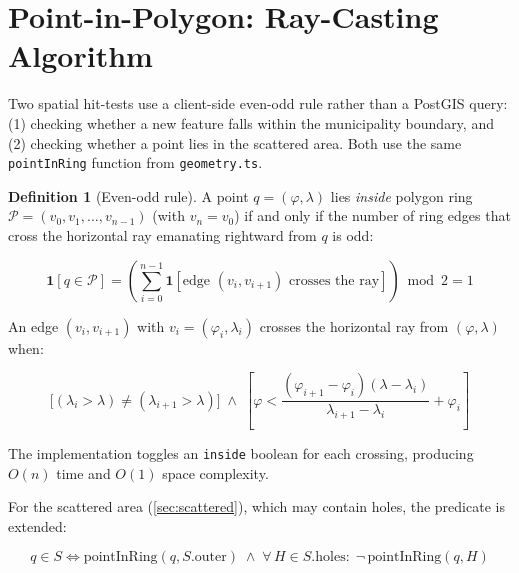 \documentclass[12pt,a4paper]{article}
\theoremstyle{definition}
\newtheorem{definition}{Definition}[section]
\theoremstyle{plain}
\theoremstyle{remark}
\begin{document}
\section{Point-in-Polygon: Ray-Casting Algorithm}
\label{sec:pip}

Two spatial hit-tests use a client-side even-odd rule rather than a
PostGIS query: (1) checking whether a new feature falls within the
municipality boundary, and (2) checking whether a point lies in the
scattered area. Both use the same \texttt{pointInRing} function from
\texttt{geometry.ts}.

\begin{definition}[Even-odd rule]
A point $q = (\varphi, \lambda)$ lies \emph{inside} polygon ring
$\mathcal{P} = (v_0, v_1, \ldots, v_{n-1})$ (with $v_n = v_0$) if and
only if the number of ring edges that cross the horizontal ray emanating
rightward from $q$ is odd:

\begin{equation}
  \mathbf{1}[q \in \mathcal{P}] =
  \left(\sum_{i=0}^{n-1} \mathbf{1}[\text{edge } (v_i, v_{i+1})
  \text{ crosses the ray}]\right) \bmod 2 = 1
  \label{eq:pip_even_odd}
\end{equation}
\end{definition}

An edge $(v_i, v_{i+1})$ with $v_i = (\varphi_i, \lambda_i)$
crosses the horizontal ray from $(\varphi, \lambda)$ when:

\begin{equation}
  \bigl[(\lambda_i > \lambda) \neq (\lambda_{i+1} > \lambda)\bigr]
  \;\land\;
  \left[
    \varphi < \frac{(\varphi_{i+1} - \varphi_i)(\lambda - \lambda_i)}
                   {\lambda_{i+1} - \lambda_i} + \varphi_i
  \right]
  \label{eq:pip_crossing}
\end{equation}

The implementation toggles an \texttt{inside} boolean for each crossing,
producing $O(n)$ time and $O(1)$ space complexity.

For the scattered area (\cref{sec:scattered}), which may contain holes,
the predicate is extended:

\begin{equation}
  q \in S \iff
  \text{pointInRing}(q, S.\mathrm{outer})
  \;\land\;
  \forall\, H \in S.\mathrm{holes}:\;
  \neg\,\text{pointInRing}(q, H)
  \label{eq:pip_with_holes}
\end{equation}
\end{document}
